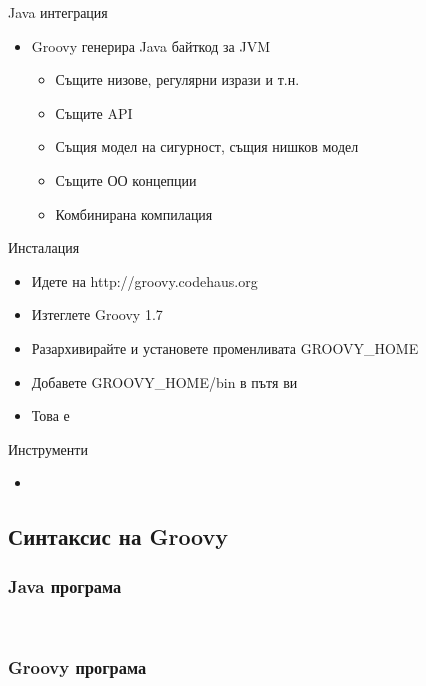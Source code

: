 \documentclass[compress,red]{beamer}
\begin{document}
\begin{frame}{Java интеграция}
  \transdissolve
  \begin{itemize}
  \item Groovy генерира Java байткод за JVM
    \begin{itemize}
      \item Същите низове, регулярни изрази и т.н.
      \item Същите API
      \item Същия модел на сигурност, същия нишков модел
      \item Същите ОО концепции
      \item Комбинирана компилация
    \end{itemize}
  \end{itemize}
\end{frame}

\begin{frame}{Инсталация}
  \transdissolve
  \begin{itemize}
  \item Идете на http://groovy.codehaus.org
  \item Изтеглете Groovy 1.7
  \item Разархивирайте и установете променливата GROOVY\_HOME
  \item Добавете GROOVY\_HOME/bin в пътя ви
  \item Това е 
  \end{itemize}
\end{frame}

\begin{frame}{Инструменти}
  \transdissolve
  \begin{itemize}
  \item 
  \end{itemize}
\end{frame}


\subsection{Синтаксис на Groovy}
\begin{frame}[fragile]
  \frametitle{Java програма}
  \transdissolve
\begin{lstlisting}
  
\end{lstlisting}
\end{frame}

\begin{frame}[fragile]
  \frametitle{Groovy програма}
  \transdissolve
\begin{lstlisting}
  
\end{lstlisting}
\end{frame}
\end{document}
